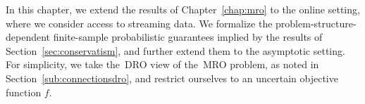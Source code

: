 In this chapter, we extend the results of Chapter~\ref{chap:mro} to the online setting, where we consider access to streaming data. 
We formalize the problem-structure-dependent finite-sample probabilistic guarantees implied by the results of Section~\ref{sec:conservatism}, and further extend them to the asymptotic setting. 
For simplicity, we take the~\gls{DRO} view of the~\gls{MRO} problem, as noted in Section~\ref{sub:connectionsdro}, and restrict ourselves to an uncertain objective function $f$.

